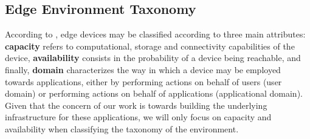 \subsection{Edge Environment Taxonomy} \label{subsec:edge_taxonomy}

According to \textcite{Leitao2018}, edge devices may be classified according to three main attributes: \textbf{capacity} refers to computational, storage and connectivity capabilities of the device,  \textbf{availability} consists in the probability of a device being reachable, and finally, \textbf{domain} characterizes the way in which a device may be employed towards applications, either by performing actions on behalf of users (user domain) or performing actions on behalf of applications (applicational domain). Given that the concern of our work is towards building the underlying infrastructure for these applications, we will only focus on capacity and availability when classifying the taxonomy of the environment. 

\begin{table}[!htb]
    \caption{Taxonomy of the edge environment}
    \begin{minipage}{.45\linewidth}
        \centering
    \end{minipage} %
    \begin{minipage}{.45\linewidth}
        \centering
    \end{minipage} 
    \label{tab:taxonomy_edge}
\end{table}

